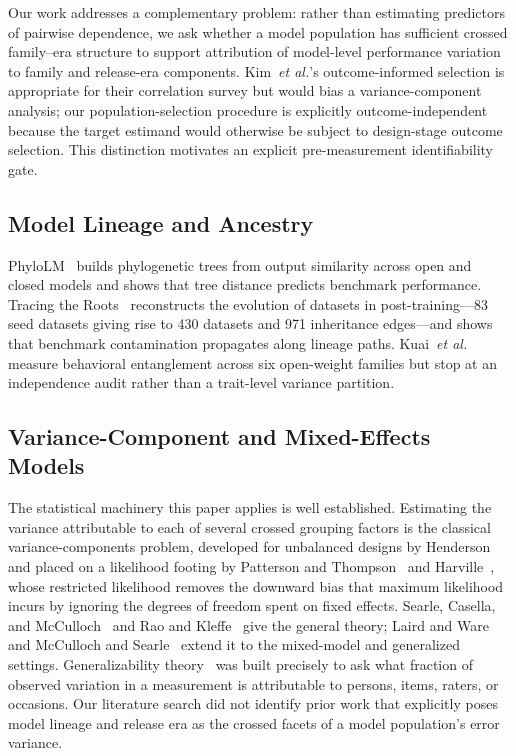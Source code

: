 \documentclass[11pt]{article}
\theoremstyle{definition}
\theoremstyle{plain}
\begin{document}
Our work addresses a complementary problem: rather than estimating predictors of pairwise dependence, we ask whether a model population has sufficient crossed family--era structure to support attribution of model-level performance variation to family and release-era components. Kim~\textit{et al.}'s outcome-informed selection is appropriate for their correlation survey but would bias a variance-component analysis; our population-selection procedure is explicitly outcome-independent because the target estimand would otherwise be subject to design-stage outcome selection. This distinction motivates an explicit pre-measurement identifiability gate.

\subsection{Model Lineage and Ancestry}
PhyloLM~\cite{phylolm2024} builds phylogenetic trees from output similarity across open and closed models and shows that tree distance predicts benchmark performance. Tracing the Roots~\cite{li2026roots} reconstructs the evolution of datasets in post-training---83 seed datasets giving rise to 430 datasets and 971 inheritance edges---and shows that benchmark contamination propagates along lineage paths. Kuai~\textit{et al.}~\cite{kuai2026} measure behavioral entanglement across six open-weight families but stop at an independence audit rather than a trait-level variance partition.

\subsection{Variance-Component and Mixed-Effects Models}
The statistical machinery this paper applies is well established. Estimating the variance attributable to each of several crossed grouping factors is the classical variance-components problem, developed for unbalanced designs by Henderson~\cite{henderson1975} and placed on a likelihood footing by Patterson and Thompson~\cite{patterson1971} and Harville~\cite{harville1977}, whose restricted likelihood removes the downward bias that maximum likelihood incurs by ignoring the degrees of freedom spent on fixed effects. Searle, Casella, and McCulloch~\cite{searle1992} and Rao and Kleffe~\cite{rao1988} give the general theory; Laird and Ware~\cite{laird1982} and McCulloch and Searle~\cite{mcculloch2001} extend it to the mixed-model and generalized settings. Generalizability theory~\cite{brennan2001,cronbach1972} was built precisely to ask what fraction of observed variation in a measurement is attributable to persons, items, raters, or occasions. Our literature search did not identify prior work that explicitly poses model lineage and release era as the crossed facets of a model population's error variance.
\end{document}
